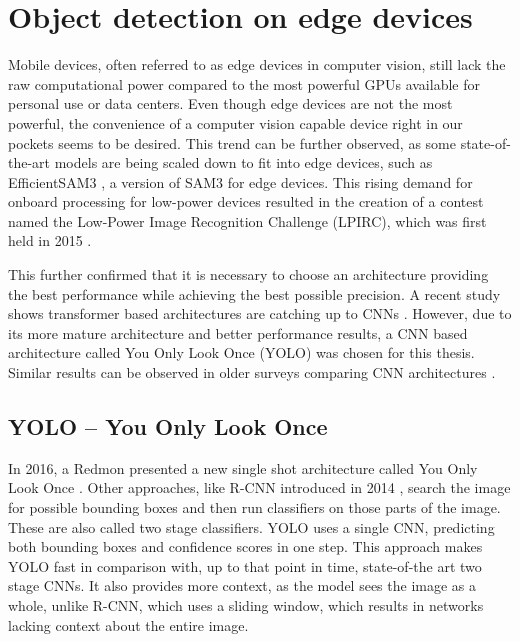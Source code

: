 \section{Object detection on edge devices}
Mobile devices, often referred to as edge devices in computer vision, still lack the raw computational power compared to the most powerful GPUs available for personal use or data centers. Even though edge devices are not the most powerful, the convenience of a computer vision capable device right in our pockets seems to be desired. This trend can be further observed, as some state-of-the-art models are being scaled down to fit into edge devices, such as EfficientSAM3 \cite{zeng2025efficientsam3}, a version of SAM3 for edge devices. This rising demand for onboard processing for low-power devices resulted in the creation of a contest named the Low-Power Image Recognition Challenge (LPIRC), which was first held in 2015 \cite{alyamkin2019low}.

This further confirmed that it is necessary to choose an architecture providing the best performance while achieving the best possible precision. A recent study shows transformer based architectures are catching up to CNNs \cite{wang2026evolution}. However, due to its 
more mature architecture and better performance results, a CNN based architecture called You Only Look Once (YOLO) was chosen for this thesis. Similar results can be observed in older surveys comparing CNN architectures \cite{objectDetectionSurvey2024, objectDetectionSurvey2025}.

\subsection{YOLO -- You Only Look Once}
\label{yolo}
In 2016, a Redmon presented a new single shot architecture called You Only Look Once \cite{Redmon_2016_CVPR}. Other approaches, like R-CNN introduced in 2014 \cite{girshick2014rich}, search the image for possible bounding boxes and then run classifiers on those parts of the image. These are also called two stage classifiers. YOLO uses a single CNN, predicting both bounding boxes and confidence scores in one step. This approach makes YOLO fast in comparison with, up to that point in time, state-of-the art two stage CNNs. It also provides more context, as the model sees the image as a whole, unlike R-CNN, which uses a sliding window, which results in networks lacking context about the entire image.


